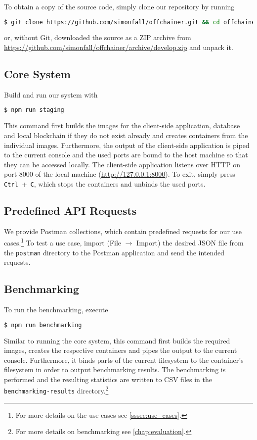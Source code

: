			To obtain a copy of the source code, simply clone our repository by running
			\begin{lstlisting}[language=bash]
$ git clone https://github.com/simonfall/offchainer.git && cd offchainer 
			\end{lstlisting}
			or, without Git, downloaded the source as a ZIP archive from \url{https://github.com/simonfall/offchainer/archive/develop.zip} and unpack it.

		\subsection*{Core System}
		\label{subsec:deployment-coresystem}

			Build and run our system with
			\begin{lstlisting}[language=bash]
$ npm run staging 
			\end{lstlisting}
			This command first builds the images for the client-side application, database and local blockchain if they do not exist already and creates containers from the individual images.
			Furthermore, the output of the client-side application is piped to the current console and the used ports are bound to the host machine so that they can be accessed locally.
			The client-side application listens over HTTP on port 8000 of the local machine (\url{http://127.0.0.1:8000}).
			To exit, simply press \mbox{\texttt{Ctrl} + \texttt{C}}, which stops the containers and unbinds the used ports.

		\subsection*{Predefined API Requests}
		\label{subsec:deployment-api}

			We provide Postman collections, which contain predefined requests for our use cases.\footnote{For more details on the use cases see \autoref{sssec:use_cases}.} To test a use case, import (File $\rightarrow$ Import) the desired JSON file from the \texttt{postman} directory to the Postman application and send the intended requests.
		
		\subsection*{Benchmarking}
		\label{subsec:deployment-benchmarking}

			To run the benchmarking, execute
			\begin{lstlisting}[language=bash]
$ npm run benchmarking
			\end{lstlisting}
			Similar to running the core system, this command first builds the required images, creates the respective containers and pipes the output to the current console.
			Furthermore, it binds parts of the current filesystem to the container's filesystem in order to output benchmarking results.
			The benchmarking is performed and the resulting statistics are written to CSV files in the \texttt{benchmarking-results} directory.\footnote{For more details on benchmarking see \autoref{chap:evaluation}.}

